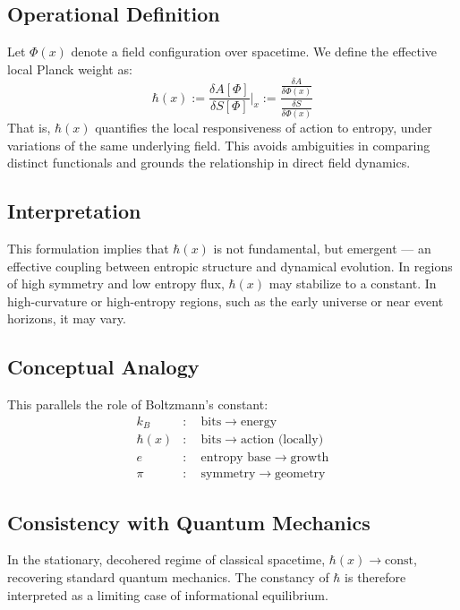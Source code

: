\documentclass[12pt, a4paper]{article}
\begin{document}
\subsection*{Operational Definition}

Let \( \Phi(x) \) denote a field configuration over spacetime. We define the effective local Planck weight as:
\[
\hbar(x) := \frac{\delta A[\Phi]}{\delta S[\Phi]} \Big|_x := \frac{ \frac{\delta A}{\delta \Phi(x)} }{ \frac{\delta S}{\delta \Phi(x)} }
\]
That is, \( \hbar(x) \) quantifies the local responsiveness of action to entropy, under variations of the same underlying field. This avoids ambiguities in comparing distinct functionals and grounds the relationship in direct field dynamics.

\subsection*{Interpretation}

This formulation implies that \( \hbar(x) \) is not fundamental, but emergent — an effective coupling between entropic structure and dynamical evolution. In regions of high symmetry and low entropy flux, \( \hbar(x) \) may stabilize to a constant. In high-curvature or high-entropy regions, such as the early universe or near event horizons, it may vary.

\subsection*{Conceptual Analogy}

This parallels the role of Boltzmann’s constant:
\[
\begin{aligned}
k_B &: \quad \text{bits} \to \text{energy} \\
\hbar(x) &: \quad \text{bits} \to \text{action (locally)} \\
e &: \quad \text{entropy base} \to \text{growth} \\
\pi &: \quad \text{symmetry} \to \text{geometry}
\end{aligned}
\]

\subsection*{Consistency with Quantum Mechanics}

In the stationary, decohered regime of classical spacetime, \( \hbar(x) \to \text{const} \), recovering standard quantum mechanics. The constancy of \( \hbar \) is therefore interpreted as a limiting case of informational equilibrium.
\end{document}
